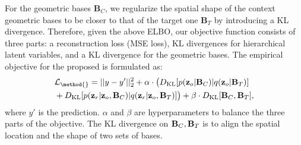 For the geometric bases $\mathbf{B}_C$, we regularize the spatial shape of the context geometric bases to be closer to that of the target one $\mathbf{B}_T$ by introducing a KL divergence. 
Therefore, given the above ELBO, our objective function consists of three parts: a reconstruction loss (MSE loss), KL divergences for hierarchical latent variables, and a KL divergence for the geometric bases. 
The empirical objective for the proposed \method{} is formulated as:
\begin{equation}
\begin{aligned}
& \mathcal{L}_{\text{\method{}}}  =  ||y - y'||^2_2 + \alpha \cdot \big(  D_{\text{KL}} [p(\mathbf{z}_o|{\bf{B}}_C)|q(\mathbf{z}_o|{\bf{B}}_T)] \\
    & + D_{\text{KL}}[p(\mathbf{z}_r|\mathbf{z}_o,{\bf{B}}_C)|q(\mathbf{z}_r|\mathbf{z}_o,{\bf{B}}_T)] \big) + \beta \cdot D_{\text{KL}}[{\bf{B}}_C, {\bf{B}}_T],
\end{aligned}
\end{equation}
where $y'$ is the prediction. $\alpha$ and $\beta$ are hyperparameters to balance the three parts of the objective. The KL divergence on ${\bf{B}}_C, {\bf{B}}_T$ is to align the spatial location and the shape of two sets of bases. 




 


